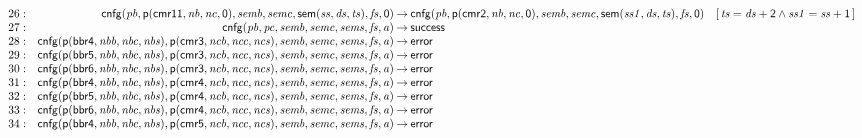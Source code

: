 \documentclass[a4paper]{article}
\newcommand{\symb}[1]{\mathsf{#1}}
\newcommand{\var}[1]{\mathit{#1}}
\newcommand{\Constraint}[1]{[\, #1 \,]}
\begin{document}
\begin{landscape}
\[\begin{array}{rr@{\>}c@{\>}ll}
\mathrm{26} : 
 & \symb{cnfg}(\var{pb},\symb{p}(\symb{cmr11},\var{nb},\var{nc},\symb{0}),\var{semb},\var{semc},\symb{sem}(\var{ss},\var{ds},\var{ts}),\var{fs},\symb{0})
 & \to 
 & \symb{cnfg}(\var{pb},\symb{p}(\symb{cmr2},\var{nb},\var{nc},\symb{0}),\var{semb},\var{semc},\symb{sem}(\var{ss1},\var{ds},\var{ts}),\var{fs},\symb{0})
 & \Constraint{\var{ts} = \var{ds} + \symb{2} \land \var{ss1} = \var{ss} + \symb{1}}\\

\mathrm{27} : 
 & \symb{cnfg}(\var{pb},\var{pc},\var{semb},\var{semc},\var{sems},\var{fs},\var{a})
 & \to 
 & \symb{success}\\

\mathrm{28} : 
 & \symb{cnfg}(\symb{p}(\symb{bbr4},\var{nbb},\var{nbc},\var{nbs}),\symb{p}(\symb{cmr3},\var{ncb},\var{ncc},\var{ncs}),\var{semb},\var{semc},\var{sems},\var{fs},\var{a})
 & \to 
 & \symb{error}\\

\mathrm{29} : 
 & \symb{cnfg}(\symb{p}(\symb{bbr5},\var{nbb},\var{nbc},\var{nbs}),\symb{p}(\symb{cmr3},\var{ncb},\var{ncc},\var{ncs}),\var{semb},\var{semc},\var{sems},\var{fs},\var{a})
 & \to 
 & \symb{error}\\

\mathrm{30} : 
 & \symb{cnfg}(\symb{p}(\symb{bbr6},\var{nbb},\var{nbc},\var{nbs}),\symb{p}(\symb{cmr3},\var{ncb},\var{ncc},\var{ncs}),\var{semb},\var{semc},\var{sems},\var{fs},\var{a})
 & \to 
 & \symb{error}\\

\mathrm{31} : 
 & \symb{cnfg}(\symb{p}(\symb{bbr4},\var{nbb},\var{nbc},\var{nbs}),\symb{p}(\symb{cmr4},\var{ncb},\var{ncc},\var{ncs}),\var{semb},\var{semc},\var{sems},\var{fs},\var{a})
 & \to 
 & \symb{error}\\

\mathrm{32} : 
 & \symb{cnfg}(\symb{p}(\symb{bbr5},\var{nbb},\var{nbc},\var{nbs}),\symb{p}(\symb{cmr4},\var{ncb},\var{ncc},\var{ncs}),\var{semb},\var{semc},\var{sems},\var{fs},\var{a})
 & \to 
 & \symb{error}\\

\mathrm{33} : 
 & \symb{cnfg}(\symb{p}(\symb{bbr6},\var{nbb},\var{nbc},\var{nbs}),\symb{p}(\symb{cmr4},\var{ncb},\var{ncc},\var{ncs}),\var{semb},\var{semc},\var{sems},\var{fs},\var{a})
 & \to 
 & \symb{error}\\

\mathrm{34} : 
 & \symb{cnfg}(\symb{p}(\symb{bbr4},\var{nbb},\var{nbc},\var{nbs}),\symb{p}(\symb{cmr5},\var{ncb},\var{ncc},\var{ncs}),\var{semb},\var{semc},\var{sems},\var{fs},\var{a})
 & \to 
 & \symb{error}\\


\end{array}\]
\end{landscape}
\end{document}
